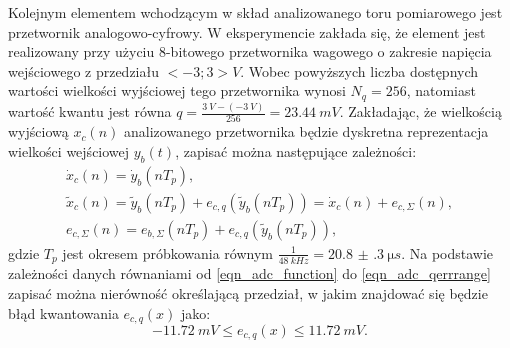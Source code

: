 Kolejnym elementem wchodzącym w skład analizowanego toru pomiarowego jest przetwornik analogowo-cyfrowy. W eksperymencie zakłada się, że element jest realizowany przy użyciu 8-bitowego przetwornika wagowego o zakresie napięcia wejściowego z przedziału $<-3;3>\unit{V}$. Wobec powyższych liczba dostępnych wartości wielkości wyjściowej tego przetwornika wynosi $N_{q} = 256$, natomiast wartość kwantu jest równa $q = \frac{\qty{3}{V} - (\qty{-3}{V})}{256} = \qty{23.44}{mV}$. Zakładając, że wielkością wyjściową $x_{c}(n)$ analizowanego przetwornika będzie dyskretna reprezentacja wielkości wejściowej $y_{b}(t)$, zapisać można następujące zależności:
\begin{gather}
\dot{x}_{c} \left( n \right) = \dot{y}_{b} \left( nT_{p} \right) \label{eqn_sym_partc_out_ideal}, \\
\tilde{x}_{c} \left( n \right) = \tilde{y}_{b} \left( nT_{p} \right) + e_{c,q} \left( \tilde{y}_{b} \left( nT_{p} \right) \right) = \dot{x}_{c} \left( n \right) + e_{c,\Sigma} \left( n \right) \label{eqn_sym_partc_out_real}, \\
e_{c,\Sigma} \left( n \right) = e_{b,\Sigma} \left( nT_{p} \right) + e_{c,q} \left( \tilde{y}_{b} \left( nT_{p} \right) \right) \label{eqn_sym_partc_error_sum},
\end{gather}
gdzie $T_{p}$ jest okresem próbkowania równym $\frac{1}{\qty{48}{kHz}} = \qty{20.8(3)}{\micro s}$.
Na podstawie zależności danych równaniami od \eqref{eqn_adc_function} do \eqref{eqn_adc_qerrrange} zapisać można nierówność określającą przedział, w jakim znajdować się będzie błąd kwantowania $e_{c,q}(x)$ jako:
\begin{equation}
\qty{-11.72}{mV} \le e_{c,q} \left( x \right) \le \qty{11.72}{mV} \label{eqn_sym_partc_error_quant}.
\end{equation}

